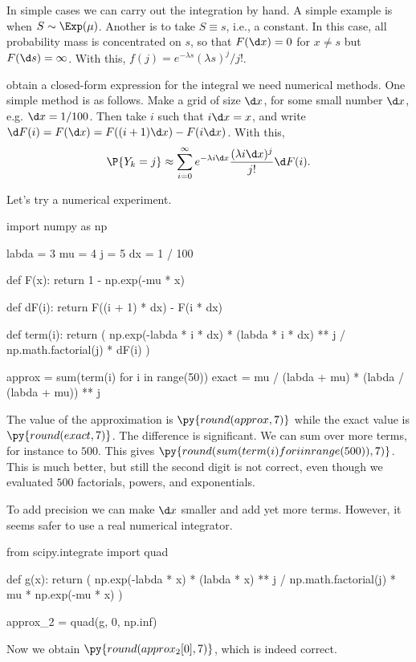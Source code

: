 In simple cases we can carry out the integration by hand.
A simple example is when $S\sim \Exp(\mu)$. Another is to take $S\equiv s$, i.e., a constant.
In this case, all probability mass is concentrated on $s$, so that $F(\d x) = 0$ for $x\neq s$ but $F(\d s) = \infty$.
With this, $f(j) = e^{-\lambda s}(\lambda s)^j/{j!}$.

 obtain a closed-form expression for the integral we need numerical methods.
One simple method is as follows.
Make a grid of size $\d x$, for some small number $\d x$, e.g.
$\d x=1/100$. Then  take $i$ such that $i \d x = x$, and  write $\d F(i ) =  F(\d x) = F((i+1)\d x) - F(i \d x)$.
With this,
 \begin{equation*}
 \P{Y_k = j}  \approx \sum_{i=0}^\infty e^{-\lambda i \d x}\frac{(\lambda i\d x)^j}{j!} \d F(i).
\end{equation*}

Let's try a numerical experiment.
\begin{pyblock}
import numpy as np

labda = 3
mu = 4
j = 5
dx = 1 / 100


def F(x):
    return 1 - np.exp(-mu * x)


def dF(i):
    return F((i + 1) * dx) - F(i * dx)


def term(i):
    return (
        np.exp(-labda * i * dx)
        * (labda * i * dx) ** j
        / np.math.factorial(j)
        * dF(i)
    )


approx = sum(term(i) for i in range(50))
exact = mu / (labda + mu) * (labda / (labda + mu)) ** j
\end{pyblock}
The value of the approximation is $\py{round(approx, 7)}$ while the exact value is $\py{round(exact, 7)}$.
The difference is significant.
We can sum over more terms, for instance to $500$.
This gives $\py{round(sum(term(i) for i in range(500)),7)}$.
This is much better, but still the second digit is not correct, even though we evaluated $500$ factorials, powers, and exponentials.

To add precision we can make $\d x$ smaller and add yet more terms.
However, it seems safer to use a real numerical integrator.
\begin{pyblock}
from scipy.integrate import quad


def g(x):
    return (
        np.exp(-labda * x)
        * (labda * x) ** j
        / np.math.factorial(j)
        * mu
        * np.exp(-mu * x)
    )


approx_2 = quad(g, 0, np.inf)
\end{pyblock}
Now we obtain $\py{round(approx_2[0], 7)}$, which is indeed correct.


